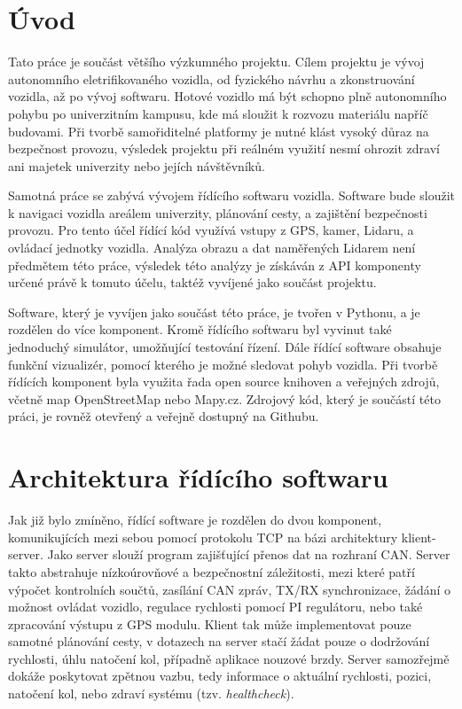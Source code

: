 \documentclass[czech,bachelor,dept460,male,cpp,cpdeclaration]{diploma}
\begin{document}
\MakeTitlePages

\section{Úvod}
\label{sec:Introduction}
Tato práce je součást většího výzkumného projektu. Cílem projektu je vývoj autonomního eletrifikovaného vozidla, 
od fyzického návrhu a zkonstruování vozidla, až po vývoj softwaru. Hotové vozidlo má být schopno plně autonomního pohybu
po univerzitním kampusu, kde má sloužit k rozvozu materiálu napříč budovami. Při tvorbě samořiditelné platformy je nutné
klást vysoký důraz na bezpečnost provozu, výsledek projektu při reálném využití nesmí ohrozit zdraví ani majetek 
univerzity nebo jejích návštěvníků. 

Samotná práce se zabývá vývojem řídícího softwaru vozidla. Software bude sloužit k navigaci vozidla areálem univerzity, 
plánování cesty, a zajištění bezpečnosti provozu. Pro tento účel řídící kód využívá vstupy z GPS, kamer, Lidaru, 
a ovládací jednotky vozidla. Analýza obrazu a dat naměřených Lidarem není předmětem této práce, výsledek této analýzy 
je získáván z API komponenty určené právě k tomuto účelu, taktéž vyvíjené jako součást projektu.

Software, který je vyvíjen jako součást této práce, je tvořen v Pythonu, a je rozdělen do více komponent. Kromě řídícího
softwaru byl vyvinut také jednoduchý simulátor, umožňující testování řízení. Dále řídící software obsahuje funkční 
vizualizér, pomocí kterého je možné sledovat pohyb vozidla. Při tvorbě řídících komponent byla využita řada open source
knihoven a veřejných zdrojů, včetně map OpenStreetMap nebo Mapy.cz. Zdrojový kód, který je součástí této práci, je 
rovněž otevřený a veřejně dostupný na Githubu.

\section{Architektura řídícího softwaru}
Jak již bylo zmíněno, řídící software je rozdělen do dvou komponent, komunikujících mezi sebou pomocí protokolu TCP na bázi 
architektury klient-server. Jako server slouží program zajišťující přenos dat na rozhraní CAN. Server takto abstrahuje 
nízkoúrovňové a bezpečnostní záležitosti, mezi které patří výpočet kontrolních součtů, zasílání CAN zpráv, TX/RX synchronizace, 
žádání o možnost ovládat vozidlo, regulace rychlosti pomocí PI regulátoru, nebo také zpracování výstupu z GPS modulu. Klient tak
může implementovat pouze samotné plánování cesty, v dotazech na server stačí žádat pouze o dodržování rychlosti, úhlu natočení 
kol, případně aplikace nouzové brzdy. Server samozřejmě dokáže poskytovat zpětnou vazbu, tedy informace o aktuální rychlosti,
pozici, natočení kol, nebo zdraví systému (tzv. \emph{healthcheck}).
\end{document}
